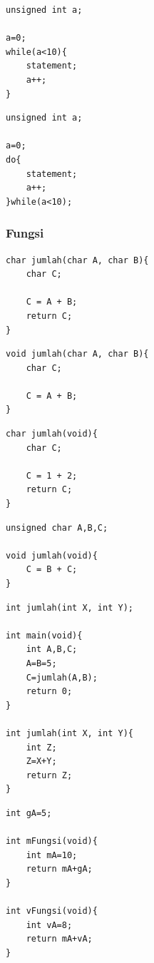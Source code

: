 \documentclass[12pt,]{article}
\begin{document}
	\begin{verbatim}
unsigned int a;

a=0;
while(a<10){
	statement;
	a++;
}
	\end{verbatim}

	\begin{verbatim}
unsigned int a;

a=0;
do{
	statement;
	a++;
}while(a<10);
	\end{verbatim}

	\subsubsection{Fungsi}
	\begin{verbatim}
char jumlah(char A, char B){
	char C;

	C = A + B;
	return C;
}
	\end{verbatim}

	\begin{verbatim}
void jumlah(char A, char B){
	char C;

	C = A + B;
}
	\end{verbatim}

	\begin{verbatim}
char jumlah(void){
	char C;

	C = 1 + 2;
	return C;
}
	\end{verbatim}

	\begin{verbatim}
unsigned char A,B,C;

void jumlah(void){
	C = B + C;
}
	\end{verbatim}

	\begin{verbatim}
int jumlah(int X, int Y);

int main(void){
	int A,B,C;
	A=B=5;
	C=jumlah(A,B);
	return 0;
}

int jumlah(int X, int Y){
	int Z;
	Z=X+Y;
	return Z;
}
	\end{verbatim}

	\begin{verbatim}
int gA=5;

int mFungsi(void){
	int mA=10;
	return mA+gA;
}

int vFungsi(void){
	int vA=8;
	return mA+vA;
}
	\end{verbatim}
\end{document}
